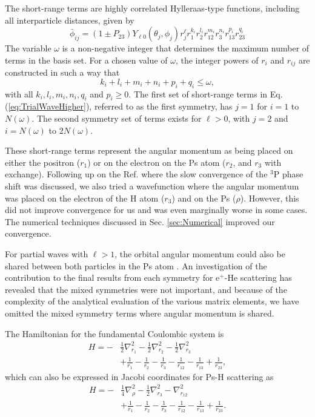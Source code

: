 \documentclass[preprint,showpacs,preprintnumbers,amsmath,amssymb,longbibliography,pra,aps]{revtex4-1}
\begin{document}
The short-range terms are highly correlated Hylleraas-type functions, including all interparticle distances, given by
\begin{equation}
\label{eq:PhiDef}
\bar{\phi}_{ij} = \left(1 \pm P_{23}\right) Y_{\ell 0}(\theta_j,\phi_j) r_j^{\ell} r_1^{k_i} r_2^{l_i} r_{12}^{m_i} r_3^{n_i} r_{13}^{p_i} r_{23}^{q_i}
\end{equation}
The variable $\omega$ is a non-negative integer that determines the maximum number of terms in the basis set. For a chosen value of $\omega$, the integer powers of $r_i$ and $r_{ij}$ are constructed in such a way that 
\begin{equation}
k_i + l_i + m_i + n_i + p_i + q_i \leq \omega,
\end{equation}
with all $k_i, l_i, m_i, n_i, q_i$ and $p_i \geq 0$.
The first set of short-range terms in Eq. (\ref{eq:TrialWaveHigher}), referred to as the first symmetry, has $j=1$ for $i=1$ to $N(\omega)$. The second symmetry set of terms exists for $\ell > 0$, with $j=2$ and $i = N(\omega)$ to $2N(\omega)$.

These short-range terms represent the angular momentum as being placed on either the positron ($r_1$) or on the electron on the Ps atom ($r_2$, and $r_3$ with exchange). Following up on the Ref. \cite{VanReeth2004} where the slow convergence of the $^3$P phase shift was discussed, we also tried a wavefunction where the angular momentum was placed on the electron of the H atom ($r_3$) and on the Ps ($\rho$). However, this did not improve convergence for us and was even marginally worse in some cases. The numerical techniques discussed in Sec. \ref{sec:Numerical} improved our convergence.

For partial waves with $\ell>1$, the orbital angular momentum could also be shared between both particles in the Ps atom \cite{Schwartz1961a}. An investigation of the contribution to the final results from each symmetry for e$^+$-He scattering \cite{VanReeth1997} has revealed that the mixed symmetries were not important, and because of the complexity of the analytical evaluation of the various matrix elements, we have omitted the mixed symmetry terms where angular momentum is shared.

The Hamiltonian for the fundamental Coulombic system is
\begin{align}
H = -&\frac{1}{2} \nabla_{r_1}^2 - \frac{1}{2} \nabla_{r_2}^2 - \frac{1}{2} \nabla_{r_3}^2  \nonumber \\
&+ \frac {1}{r_1}-\frac {1}{r_2}-\frac {1}{r_3}-\frac {1}{r_{12}}-\frac {1}{r_{13}}+\frac {1}{r_{23}},
\label{eq:Hamiltonian1}
\end{align}
which can also be expressed in Jacobi coordinates for Ps-H scattering as
\begin{align}
H = -&\frac{1}{4} \nabla_{\rho}^2 - \frac{1}{2} \nabla_{r_3}^2 - \nabla_{r_{12}}^2  \nonumber \\
&+ \frac {1}{r_1}-\frac {1}{r_2}-\frac {1}{r_3}-\frac {1}{r_{12}}-\frac {1}{r_{13}}+\frac {1}{r_{23}}.
\label{eq:Hamiltonian2}
\end{align}
\end{document}
